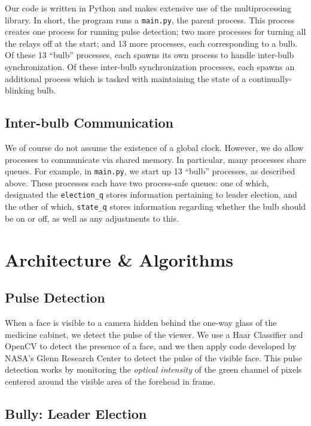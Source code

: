 \documentclass[preprint,review,12pt]{cs262}
\begin{document}
Our code is written in Python and makes extensive use of the multiprocessing library. In short, the program runs a \texttt{main.py}, the parent process. This process creates one process for running pulse detection; two more processes for turning all the relays off at the start; and 13 more processes, each corresponding to a bulb. Of these 13 ``bulb'' processes, each spawns its own process to handle inter-bulb synchronization. Of these inter-bulb synchronization processes, each spawns an additional process which is tasked with maintaining the state of a continually-blinking bulb. 

\subsection{Inter-bulb Communication}

We of course do not assume the existence of a global clock. However, we do allow processes to communicate via shared memory. In particular, many processes share queues.  For example, in  \texttt{main.py}, we start up 13 ``bulb'' processes, as described above. These processes each have two process-safe queues: one of which, designated the \texttt{election\_q} stores information pertaining to leader election, and the other of which, \texttt{state\_q} stores information regarding whether the bulb should be on or off, as well as any adjustments to this. 

\section{Architecture \& Algorithms}

\subsection{Pulse Detection} 

When a face is visible to a camera hidden behind the one-way glass of the medicine cabinet, we detect the pulse of the viewer. We use a Haar Classifier and OpenCV to detect the presence of a face, and we then apply code developed by NASA's Glenn Research Center\cite{NASA} to detect the pulse of the visible face. This pulse detection works by monitoring the \emph{optical intensity} of the green channel of pixels centered around the visible area of the forehead in frame. 

\subsection{Bully: Leader Election}
\end{document}
